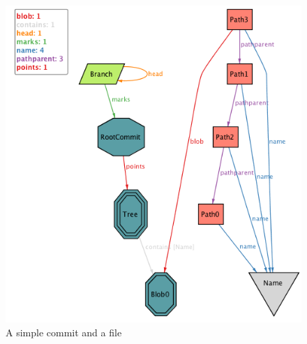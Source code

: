 \begin{figure}[h!]
	\caption{A simple commit and a file}
  \centering
    \includegraphics[scale=0.65]{images/image2.png}
\end{figure}

\pagebreak

